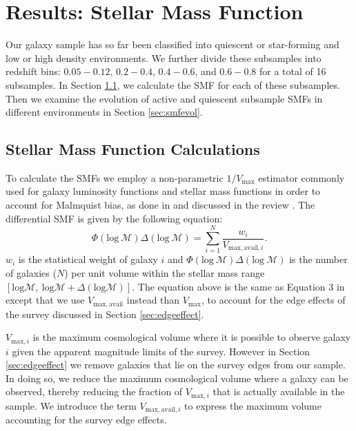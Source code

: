 \section{Results: Stellar Mass Function} \label{sec:smf}
Our galaxy sample has so far been classified into quiescent or
star-forming and low or high density environments. We further divide
these subsamples into redshift bins: $0.05-0.12$, $0.2-0.4$,
$0.4-0.6$, and $0.6-0.8$ for a total of 16 subsamples. In Section \ref{sec:smfcalc}, we calculate the SMF for each of these subsamples. Then we examine the evolution of active and quiescent subsample SMFs in different environments in Section \ref{sec:smfevol}.  
\subsection{Stellar Mass Function Calculations} \label{sec:smfcalc} 
To calculate the SMFs we employ a non-parametric $1/{V_{\mathrm{max}}}$ estimator commonly used for galaxy luminosity functions and stellar mass functions in order to account for Malmquist bias, as done in \cite{Moustakas:2013aa} and discussed in the review \cite{Johnston:2011aa}. The differential SMF is given by the following equation:
\begin{equation} \label{eq:phi}
\Phi(\mathrm{log}\: \mathcal{M}) \Delta(\mathrm{log} \:\mathcal{M}) = \sum\limits_{i=1}^{N} \frac{w_i}{V_{\mathrm{max,avail},i}}. 
\end{equation}
$w_i$ is the statistical weight of galaxy $i$ and $\Phi(\mathrm{log}\:
\mathcal{M}) \Delta(\mathrm{log}\: \mathcal{M})$ is the number of galaxies
($N$) per unit volume within the stellar mass range $[\mathrm{log}
  \mathcal{M},\: \mathrm{log} \mathcal{M}+\Delta(\mathrm{log}\mathcal{M})]$. The equation above is the same as Equation 3 in \cite{Moustakas:2013aa} except that we use $V_{\mathrm{max,avail}}$ instead than $V_{\mathrm{max}}$, to account for the edge effects of the survey discussed in Section \ref{sec:edgeeffect}. 

$V_{\mathrm{max},i}$ is the maximum cosmological volume where it is
possible to observe galaxy $i$ given the apparent magnitude limits of
the survey. However in Section \ref{sec:edgeeffect} we remove galaxies
that lie on the survey edges from our sample. In doing so, we reduce the
maximum cosmological volume where a galaxy can be observed, thereby
reducing the fraction of $V_{\mathrm{max},i}$ that is actually available
in the sample. We introduce the term $V_{\mathrm{max,avail},i}$ to express
the maximum volume accounting for the survey edge effects.

